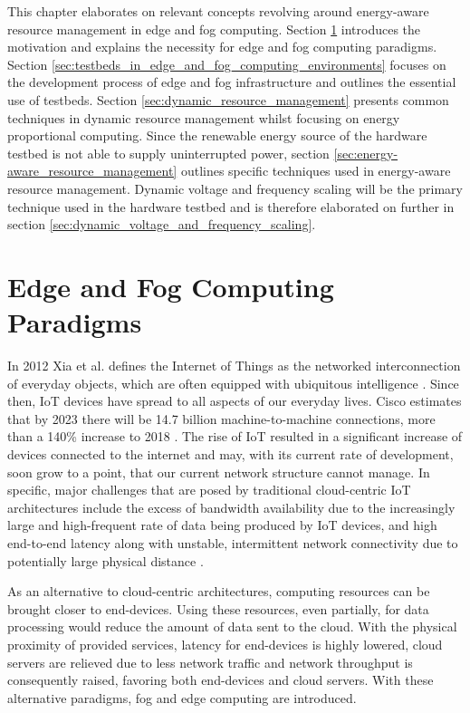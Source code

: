 This chapter elaborates on relevant concepts revolving around energy-aware
resource management in edge and fog computing. Section
\ref{sec:edge_and_fog_computing_paradigms} introduces the motivation and
explains the necessity for edge and fog computing paradigms. Section
\ref{sec:testbeds_in_edge_and_fog_computing_environments} focuses on the
development process of edge and fog infrastructure and outlines the essential
use of testbeds. Section \ref{sec:dynamic_resource_management} presents common
techniques in dynamic resource management whilst focusing on energy proportional
computing. Since the renewable energy source of the hardware testbed is not able
to supply uninterrupted power, section
\ref{sec:energy-aware_resource_management} outlines specific techniques used in
energy-aware resource management. Dynamic voltage and frequency scaling will be
the primary technique used in the hardware testbed and is therefore elaborated
on further in section \ref{sec:dynamic_voltage_and_frequency_scaling}.

\section{Edge and Fog Computing Paradigms}
\label{sec:edge_and_fog_computing_paradigms}

In 2012 Xia et al. defines the Internet of Things as the networked
interconnection of everyday objects, which are often equipped with ubiquitous
intelligence \cite{xia2012}. Since then, IoT devices have spread to all aspects
of our everyday lives. Cisco estimates that by 2023 there will be 14.7 billion
machine-to-machine connections, more than a 140\% increase to 2018
\cite{cisco2020}. The rise of IoT resulted in a significant increase of devices
connected to the internet and may, with its current rate of development, soon
grow to a point, that our current network structure cannot manage. In specific,
major challenges that are posed by traditional cloud-centric IoT architectures
include the excess of bandwidth availability due to the increasingly large and
high-frequent rate of data being produced by IoT devices, and high end-to-end
latency along with unstable, intermittent network connectivity due to
potentially large physical distance \cite{buyya2019}.

As an alternative to cloud-centric architectures, computing resources can be
brought closer to end-devices. Using these resources, even partially, for data
processing would reduce the amount of data sent to the cloud. With the physical
proximity of provided services, latency for end-devices is highly lowered, cloud
servers are relieved due to less network traffic and network throughput is
consequently raised, favoring both end-devices and cloud servers. With these
alternative paradigms, fog and edge computing are introduced.

